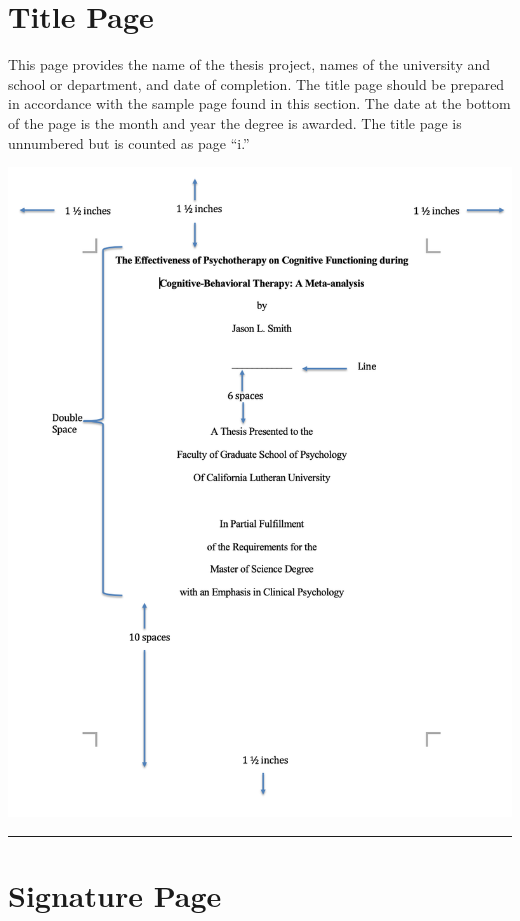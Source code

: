 \documentclass[openany]{book}
\begin{document}
\hypertarget{title-page}{%
\section{Title Page}\label{title-page}}

This page provides the name of the thesis project, names of the university and school or department, and date of completion. The title page should be prepared in accordance with the sample page found in this section. The date at the bottom of the page is the month and year the degree is awarded. The title page is unnumbered but is counted as page ``i.''

\includegraphics{images/titlepage.png}

\begin{center}\rule{0.5\linewidth}{0.5pt}\end{center}

\hypertarget{signature-page}{%
\section{Signature Page}\label{signature-page}}
\end{document}
